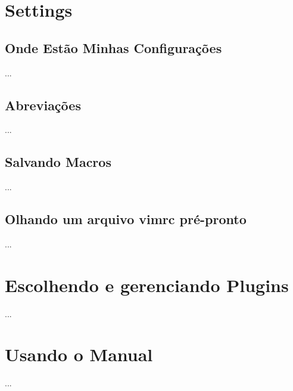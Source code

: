 \documentclass[a4paper,12pt,oneside]{book}
\begin{document}





\newcommand{\vimcommand}[1]{%
    \sethlcolor{black}%
    \textbf{\textcolor{white}{\hl{#1}}}%
}
\newcommand{\vimkeys}[1]{%
    \sethlcolor{black}%
    \textbf{\textcolor{red}{\hl{#1}}}%
}
\newcommand{\insertfigure}[3]{
\begin{figure}[!htb]
\centering
\fbox{\texttt{[image: \#2]}}
\caption{#3}
\end{figure}
}










\chapter{Settings}


\section{Onde Estão Minhas Configurações}
...
\section{Abreviações}
...
\section{Salvando Macros}
...
\section{Olhando um arquivo vimrc pré-pronto}
...
\newpage
\chapter{Escolhendo e gerenciando Plugins}
...

\newpage
\chapter{Usando o Manual}
...
\end{document}
